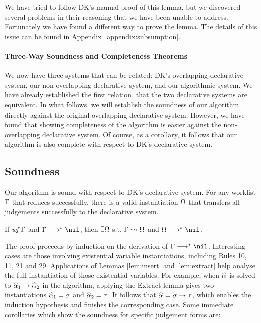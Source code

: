 We have tried to follow DK's manual proof of this lemma,
but we discovered several problems in their reasoning that we have been unable to address.
Fortunately we have found a different way to prove the lemma.
The details of this issue can be found in Appendix~\ref{appendix:subsumption}.

\paragraph{Three-Way Soundness and Completeness Theorems}
We now have three systems that can be related: DK's overlapping declarative system,
our non-overlapping declarative system, and our algorithmic system.
We have already established the first relation, that the two declarative
systems are equivalent.
In what follows, we will establish the soundness of our algorithm directly
against the original overlapping declarative system. However, we have found
that showing completeness of the algorithm is easier against the
non-overlapping declarative system. Of course, as a corollary, it follows that
our algorithm is also complete with respect to DK's declarative system.

\subsection{Soundness}

Our algorithm is sound with respect to DK's declarative system.
For any worklist $\Gamma$ that reduces successfully,
there is a valid instantiation $\Omega$ that transfers all judgements successfully to the declarative system.
\begin{theorem}[Soundness]
If \emph{wf }$\Gamma$ and $\Gm \redto \nil$, then $\exists \Omega$ s.t. $\Gamma\rightsquigarrow\Omega$ and $\Om\redto\nil$.
\end{theorem}

The proof proceeds by induction on the derivation of $\Gm\redto\nil$.
Interesting cases are those involving existential variable instantiations,
including Rules 10, 11, 21 and 29.
Applications of Lemmas \ref{lem:insert} and \ref{lem:extract}
help analyse the full instantiation of those existential variables.
For example, when $\al$ is solved to $\al[1] \to \al[2]$ in the algorithm,
applying the Extract lemma gives two instantiations $\al[1] = \sigma$ and $\al[2] = \tau$.
It follows that $\al = \sigma \to \tau$, which enables the induction hypothesis
and finishes the corresponding case. Some immediate corollaries which
show the soundness for specific judgement forms are: 


